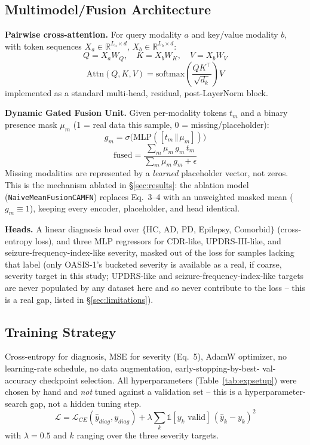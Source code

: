 \documentclass[conference]{IEEEtran}
\begin{document}
\subsection{Multimodel/Fusion Architecture}
\textbf{Pairwise cross-attention.} For query modality $a$ and
key/value modality $b$, with token sequences $X_a\in\mathbb{R}^{L_a\times
d}$, $X_b\in\mathbb{R}^{L_b\times d}$:
\begin{equation}
Q = X_a W_Q,\quad K = X_b W_K,\quad V = X_b W_V
\end{equation}
\begin{equation}
\mathrm{Attn}(Q,K,V) = \mathrm{softmax}\!\left(\frac{QK^\top}{\sqrt{d_k}}\right)V
\end{equation}
implemented as a standard multi-head, residual, post-LayerNorm block.

\textbf{Dynamic Gated Fusion Unit.} Given per-modality tokens $t_m$ and a
binary presence mask $\mu_m$ (1 = real data this sample, 0 =
missing/placeholder):
\begin{equation}
g_m = \sigma\big(\mathrm{MLP}([t_m \,\Vert\, \mu_m])\big)
\end{equation}
\begin{equation}
\mathrm{fused} = \frac{\sum_m \mu_m\, g_m\, t_m}{\sum_m \mu_m\, g_m + \epsilon}
\end{equation}
Missing modalities are represented by a \emph{learned} placeholder
vector, not zeros. This is the mechanism ablated in
\S\ref{sec:results}: the ablation model (\texttt{NaiveMeanFusionCAMFN})
replaces Eq.~3--4 with an unweighted masked mean ($g_m \equiv 1$),
keeping every encoder, placeholder, and head identical.

\textbf{Heads.} A linear diagnosis head over $\{$HC, AD, PD, Epilepsy,
Comorbid$\}$ (cross-entropy loss), and three MLP regressors for CDR-like,
UPDRS-III-like, and seizure-frequency-index-like severity, masked out of
the loss for samples lacking that label (only OASIS-1's bucketed
severity is available as a real, if coarse, severity target in this
study; UPDRS-like and seizure-frequency-index-like targets are never
populated by any dataset here and so never contribute to the loss --
this is a real gap, listed in \S\ref{sec:limitations}).

\subsection{Training Strategy}
Cross-entropy for diagnosis, MSE for severity (Eq.~5), AdamW optimizer,
no learning-rate schedule, no data augmentation, early-stopping-by-best-
val-accuracy checkpoint selection. All hyperparameters (Table~\ref{tab:expsetup})
were chosen by hand and \emph{not} tuned against a validation set --
this is a hyperparameter-search gap, not a hidden tuning step.
\begin{equation}
\mathcal{L} = \mathcal{L}_{CE}(\hat{y}_{diag}, y_{diag}) + \lambda \sum_{k} \mathbb{1}[y_k \text{ valid}]\, (\hat{y}_k - y_k)^2
\end{equation}
with $\lambda=0.5$ and $k$ ranging over the three severity targets.
\end{document}
